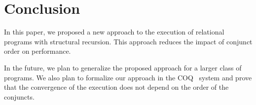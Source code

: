 \section{Conclusion}

In this paper, we proposed a new approach to the execution of relational programs with structural recursion. This approach reduces the impact of conjunct order on performance.

In the future, we plan to generalize the proposed approach for a larger class of programs. We also plan to formalize our approach in the COQ~\cite{fair:Coq} system and prove that the convergence of the execution does not depend on the order of the conjuncts.